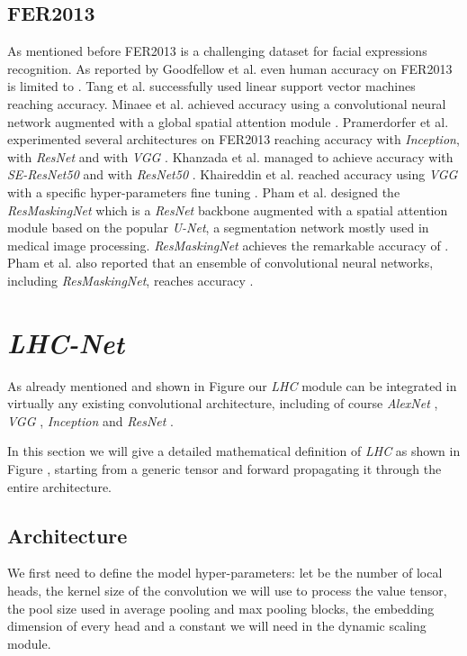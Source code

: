 \documentclass[fleqn,10pt]{SelfArx}
\begin{document}
 






\subsection{FER2013}
As mentioned before FER2013 is a challenging dataset for facial expressions recognition. 
As reported by Goodfellow et al. even human accuracy on FER2013 is limited to  \cite{FER2013}. Tang et al. \cite{FER2013} successfully used linear support vector machines reaching  accuracy.
Minaee et al. achieved  accuracy using a convolutional neural network augmented with a global spatial attention module \cite{minaee2021deep}. Pramerdorfer et al. experimented several architectures on FER2013 reaching  accuracy with \textit{Inception},  with \textit{ResNet} and  with \textit{VGG} \cite{pramerdorfer2016facial}. Khanzada et al. managed to achieve  accuracy with \textit{SE-ResNet50} and  with \textit{ResNet50} \cite{khanzada2020facial}. Khaireddin et al. reached  accuracy using \textit{VGG} with a specific hyper-parameters fine tuning \cite{khaireddin2021facial}.
Pham et al. designed the \textit{ResMaskingNet} which is a \textit{ResNet} backbone augmented with a spatial attention module based on the popular \textit{U-Net}, a segmentation network mostly used in medical image processing. \textit{ResMaskingNet} achieves the remarkable accuracy of . Pham et al. also reported that an ensemble of  convolutional neural networks, including \textit{ResMaskingNet}, reaches  accuracy \cite{resmaskingnet}.

\section{\textit{LHC-Net}}
As already mentioned and shown in Figure  our \textit{LHC} module can be integrated in virtually any existing convolutional architecture, including of course \textit{AlexNet} \cite{krizhevsky2012imagenet}, \textit{VGG} \cite{vgg}, \textit{Inception} \cite{inception} and \textit{ResNet} \cite{resnet}. 

In this section we will give a detailed mathematical definition of \textit{LHC} as shown in Figure , starting from a generic tensor and forward propagating it through the entire architecture.
\subsection{Architecture}
We first need to define the model hyper-parameters: let  be the number of local heads,  the kernel size of the convolution we will use to process the value tensor,  the pool size used in average pooling and max pooling blocks,  the embedding dimension of every head and  a constant we will need in the dynamic scaling module.
\end{document}
